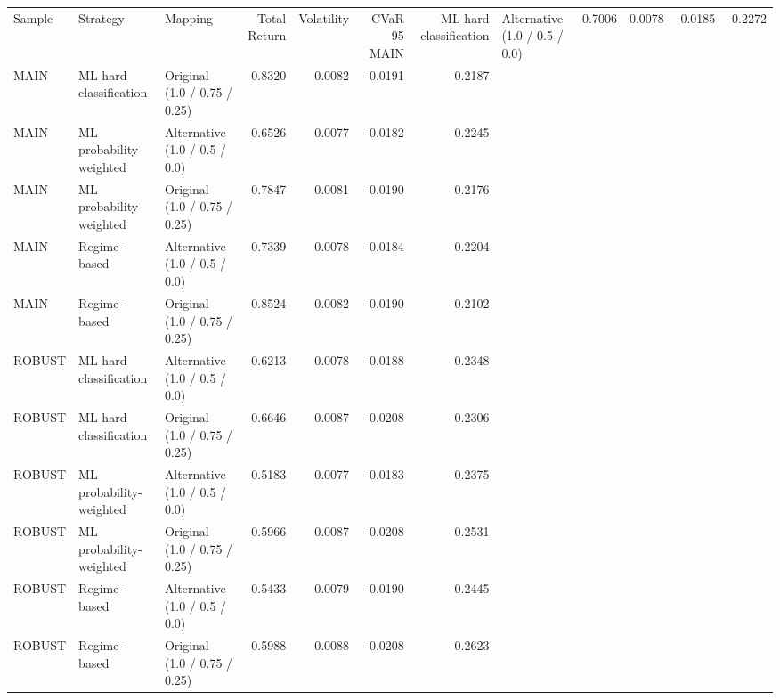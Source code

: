 \begin{tabular}{lllrrrr}
\toprule
Sample & Strategy & Mapping & Total Return & Volatility & CVaR 95%
\midrule
MAIN & ML hard classification & Alternative (1.0 / 0.5 / 0.0) & 0.7006 & 0.0078 & -0.0185 & -0.2272 \\
MAIN & ML hard classification & Original (1.0 / 0.75 / 0.25) & 0.8320 & 0.0082 & -0.0191 & -0.2187 \\
MAIN & ML probability-weighted & Alternative (1.0 / 0.5 / 0.0) & 0.6526 & 0.0077 & -0.0182 & -0.2245 \\
MAIN & ML probability-weighted & Original (1.0 / 0.75 / 0.25) & 0.7847 & 0.0081 & -0.0190 & -0.2176 \\
MAIN & Regime-based & Alternative (1.0 / 0.5 / 0.0) & 0.7339 & 0.0078 & -0.0184 & -0.2204 \\
MAIN & Regime-based & Original (1.0 / 0.75 / 0.25) & 0.8524 & 0.0082 & -0.0190 & -0.2102 \\
ROBUST & ML hard classification & Alternative (1.0 / 0.5 / 0.0) & 0.6213 & 0.0078 & -0.0188 & -0.2348 \\
ROBUST & ML hard classification & Original (1.0 / 0.75 / 0.25) & 0.6646 & 0.0087 & -0.0208 & -0.2306 \\
ROBUST & ML probability-weighted & Alternative (1.0 / 0.5 / 0.0) & 0.5183 & 0.0077 & -0.0183 & -0.2375 \\
ROBUST & ML probability-weighted & Original (1.0 / 0.75 / 0.25) & 0.5966 & 0.0087 & -0.0208 & -0.2531 \\
ROBUST & Regime-based & Alternative (1.0 / 0.5 / 0.0) & 0.5433 & 0.0079 & -0.0190 & -0.2445 \\
ROBUST & Regime-based & Original (1.0 / 0.75 / 0.25) & 0.5988 & 0.0088 & -0.0208 & -0.2623 \\
\bottomrule
\end{tabular}
